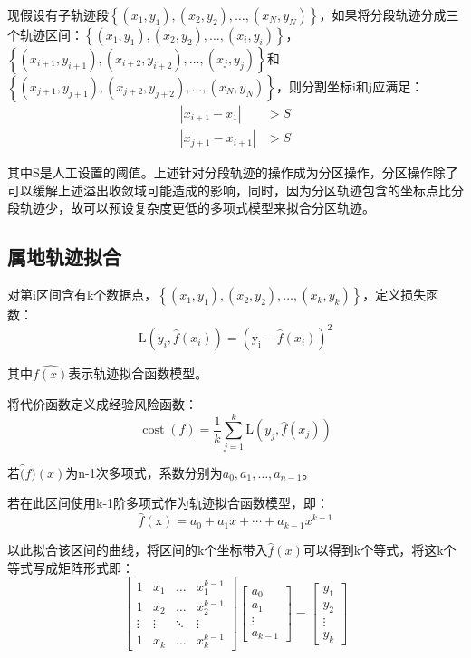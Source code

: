现假设有子轨迹段$\left\{\left(x_{1}, y_{1}\right),\left(x_{2}, y_{2}\right), \dots,\left(x_{N}, y_{N}\right)\right\}$，如果将分段轨迹分成三个轨迹区间：$\left\{\left(x_{1}, y_{1}\right),\left(x_{2}, y_{2}\right), \dots,\left(x_{i}, y_{i}\right)\right\}$，$\left\{\left(x_{i+1}, y_{i+1}\right),\left(x_{i+2}, y_{i+2}\right), \ldots,\left(x_{j}, y_{j}\right)\right\}$和$\left\{\left(x_{j+1}, y_{j+1}\right),\left(x_{j+2}, y_{j+2}\right), \dots,\left(x_{N}, y_{N}\right)\right\}$，则分割坐标i和j应满足：
\[
\begin{aligned}
\left|x_{i+1}-x_{1}\right|&>S\\
\left|x_{j+1}-x_{i+1}\right|&>S      
\end{aligned}
\]

其中S是人工设置的阈值。上述针对分段轨迹的操作成为分区操作，分区操作除了可以缓解上述溢出收敛域可能造成的影响，同时，因为分区轨迹包含的坐标点比分段轨迹少，故可以预设复杂度更低的多项式模型来拟合分区轨迹。

\subsection{属地轨迹拟合}
对第i区间含有k个数据点，$\left\{\left(x_{1}, y_{1}\right),\left(x_{2}, y_{2}\right), \ldots,\left(x_{k}, y_{k}\right)\right\}$，定义损失函数：
\[
\mathrm{L}\left(y_{i}, \hat{f}\left(x_{i}\right)\right)=\left(\mathrm{y_i}-\hat{f}\left(x_{i}\right)\right)^{2}
\]

其中$\hat{f(x)}$表示轨迹拟合函数模型。

将代价函数定义成经验风险函数：
\begin{equation}
\label{ch3costwithoutl1}
\operatorname{cost}(f)=\frac{1}{k} \sum_{j=1}^{k} \mathrm{L}\left(y_{j}, \hat{f}\left(x_{j}\right)\right)
\end{equation}

若$\hat(f)(x)$为n-1次多项式，系数分别为$a_0,a_1,…,a_{n-1}$。

若在此区间使用k-1阶多项式作为轨迹拟合函数模型，即：
\[
\hat{f}\left( \text{x} \right) =a_0+a_1x+\cdots +a_{k-1}x^{k-1}
\]

以此拟合该区间的曲线，将区间的k个坐标带入$\hat{f}(x)$可以得到k个等式，将这k个等式写成矩阵形式即：
\[
\left[\begin{array}{cccc}
{1} & {x_{1}} & {\dots} & {x_{1}^{k-1}} \\
{1} & {x_{2}} & {\dots} & {x_{2}^{k-1}} \\
{\vdots} & {\vdots} & {\ddots} & {\vdots} \\
{1} & {x_{k}} & {\dots} & {x_{k}^{k-1}}
\end{array}\right]\left[\begin{array}{c}
{a_{0}} \\
{a_{1}} \\
{\vdots} \\
{a_{k-1}}
\end{array}\right]=\left[\begin{array}{c}
{y_{1}} \\
{y_{2}} \\
{\vdots} \\
{y_{k}}
\end{array}\right]
\]


